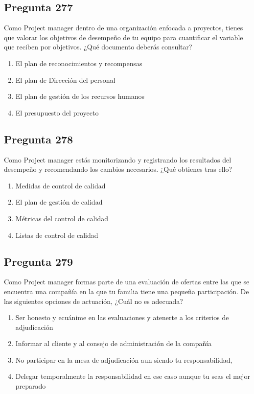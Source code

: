 \documentclass[11pt,a4paper]{article}
\begin{document}
\subsection*{Pregunta 277}
Como Project manager dentro de una organización enfocada a proyectos, tienes que valorar los objetivos de desempeño de tu equipo para cuantificar el variable que reciben por objetivos. ¿Qué documento deberás consultar?

\begin{enumerate}[label=\alph*)]
  \item El plan de reconocimientos y recompensas
  \item El plan de Dirección del personal
  \item El plan de gestión de los recursos humanos
  \item El presupuesto del proyecto
\end{enumerate}

\subsection*{Pregunta 278}
Como Project manager estás monitorizando y registrando los resultados del desempeño y recomendando los cambios necesarios. ¿Qué obtienes tras ello?

\begin{enumerate}[label=\alph*)]
  \item Medidas de control de calidad
  \item El plan de gestión de calidad
  \item Métricas del control de calidad
  \item Listas de control de calidad
\end{enumerate}

\subsection*{Pregunta 279}
Como Project manager formas parte de una evaluación de ofertas entre las que se encuentra una compañía en la que tu familia tiene una pequeña participación. De las siguientes opciones de actuación, ¿Cuál no es adecuada?

\begin{enumerate}[label=\alph*)]
  \item Ser honesto y ecuánime en las evaluaciones y atenerte a los criterios de adjudicación
  \item Informar al cliente y al consejo de administración de la compañía
  \item No participar en la mesa de adjudicación aun siendo tu responsabilidad,
  \item Delegar temporalmente la responsabilidad en ese caso aunque tu seas el mejor preparado
\end{enumerate}
\end{document}
